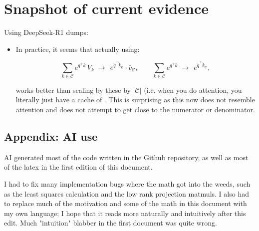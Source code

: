 \documentclass[11pt]{article}
\begin{document}
\section*{Snapshot of current evidence}
Using DeepSeek-R1 dumps:
\begin{itemize}
  \item In practice, it seems that actually using:

  \[
  \sum_{k\in\mathcal{C}} e^{q^\top k}\,V_k 
  \;\to\;
  \,e^{\tilde q^\top \tilde k_\mathcal{C}}\cdot \bar v_\mathcal{C},
  \qquad
  \sum_{k\in\mathcal{C}} e^{q^\top k}
  \;\to\;
  \,e^{\tilde q^\top \tilde k_\mathcal{C}},
  \]

  works better than scaling by these by $|\mathcal C|$ (i.e. when you do attention, you literally just have a cache of . This is surprising as this now does not resemble attention and does not attempt to get close to the numerator or denominator.
\end{itemize}

\subsection*{Appendix: AI use}
AI generated most of the code written in the Github repository, as well as most of the latex in the first edition of this document.

\noindent I had to fix many implementation bugs where the math got into the weeds, such as the least squares calculation and the low rank projection matmuls. I also had to replace much of the motivation and some of the math in this document with my own language; I hope that it reads more naturally and intuitively after this edit. Much "intuition" blabber in the first document was quite wrong.
\end{document}
